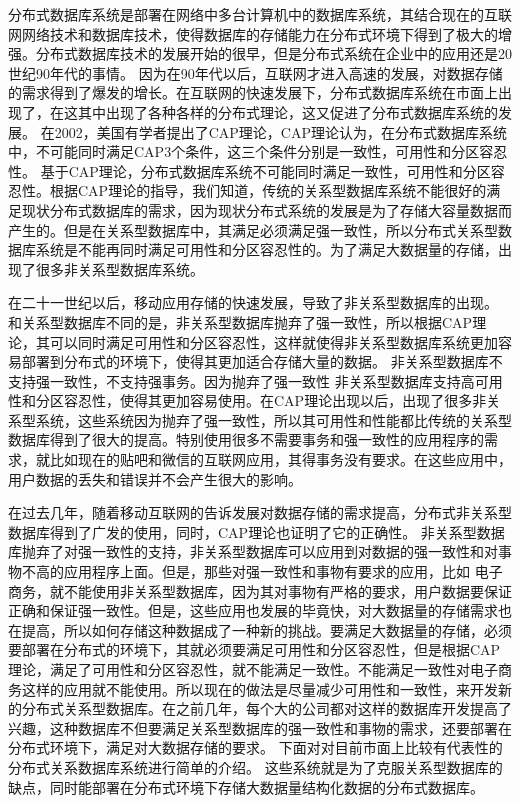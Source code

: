 分布式数据库系统是部署在网络中多台计算机中的数据库系统，其结合现在的互联网网络技术和数据库技术，使得数据库的存储能力在分布式环境下得到了极大的增强。分布式数据库技术的发展开始的很早，但是分布式系统在企业中的应用还是20世纪90年代的事情。
因为在90年代以后，互联网才进入高速的发展，对数据存储的需求得到了爆发的增长。在互联网的快速发展下，分布式数据库系统在市面上出现了，在这其中出现了各种各样的分布式理论，这又促进了分布式数据库系统的发展。 在2002，美国有学者提出了CAP理论，CAP理论认为，在分布式数据库系统中，不可能同时满足CAP3个条件，这三个条件分别是一致性，可用性和分区容忍性。 基于CAP理论，分布式数据库系统不可能同时满足一致性，可用性和分区容忍性。根据CAP理论的指导，我们知道，传统的关系型数据库系统不能很好的满足现状分布式数据库的需求，因为现状分布式系统的发展是为了存储大容量数据而产生的。但是在关系型数据库中，其满足必须满足强一致性，所以分布式关系型数据库系统是不能再同时满足可用性和分区容忍性的。为了满足大数据量的存储，出现了很多非关系型数据库系统。

在二十一世纪以后，移动应用存储的快速发展，导致了非关系型数据库的出现。
和关系型数据库不同的是，非关系型数据库抛弃了强一致性，所以根据CAP理论，其可以同时满足可用性和分区容忍性，这样就使得非关系型数据库系统更加容易部署到分布式的环境下，使得其更加适合存储大量的数据。 非关系型数据库不支持强一致性，不支持强事务。因为抛弃了强一致性
非关系型数据库支持高可用性和分区容忍性，使得其更加容易使用。在CAP理论出现以后，出现了很多非关系型系统，这些系统因为抛弃了强一致性，所以其可用性和性能都比传统的关系型数据库得到了很大的提高。特别使用很多不需要事务和强一致性的应用程序的需求，就比如现在的贴吧和微信的互联网应用，其得事务没有要求。在这些应用中，用户数据的丢失和错误并不会产生很大的影响。


在过去几年，随着移动互联网的告诉发展对数据存储的需求提高，分布式非关系型数据库得到了广发的使用，同时，CAP理论也证明了它的正确性。
非关系型数据库抛弃了对强一致性的支持，非关系型数据库可以应用到对数据的强一致性和对事物不高的应用程序上面。但是，那些对强一致性和事物有要求的应用，比如
电子商务，就不能使用非关系型数据库，因为其对事物有严格的要求，用户数据要保证正确和保证强一致性。但是，这些应用也发展的毕竟快，对大数据量的存储需求也在提高，所以如何存储这种数据成了一种新的挑战。要满足大数据量的存储，必须要部署在分布式的环境下，其就必须要满足可用性和分区容忍性，但是根据CAP理论，满足了可用性和分区容忍性，就不能满足一致性。不能满足一致性对电子商务这样的应用就不能使用。所以现在的做法是尽量减少可用性和一致性，来开发新的分布式关系型数据库。在之前几年，每个大的公司都对这样的数据库开发提高了兴趣，这种数据库不但要满足关系型数据库的强一致性和事物的需求，还要部署在分布式环境下，满足对大数据存储的要求。
下面对对目前市面上比较有代表性的分布式关系数据库系统进行简单的介绍。
这些系统就是为了克服关系型数据库的缺点，同时能部署在分布式环境下存储大数据量结构化数据的分布式数据库。

